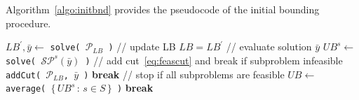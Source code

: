\documentclass[a4paper,11pt]{article}
\begin{document}
{	Algorithm~\ref{algo:initbnd} provides the pseudocode of the initial bounding procedure.
	\begin{algorithm}[!h]
		\small
		\caption{Initial bonding procedure}\label{algo:initbnd}
		\begin{algorithmic}[1]
			\State $LB^\prime, \bar{y} \gets$ \texttt{solve( $ \mathcal{P}_{LB}$ )}
			\State // update LB
			\State $ LB = LB^\prime$
			\EndIf 
			\State // evaluate solution $\bar{y}$ 
			\State $UB^s \gets$ \texttt{solve( $\mathcal{SP}^s(\bar{y})$ )}
			\State // add cut~\eqref{eq:feascut} and break if subproblem infeasible
			\State \texttt{addCut( $ \mathcal{P}_{LB}$, $\bar{y}$ )}
			\State \textbf{break}
			\EndIf
			\EndFor
			\State  // stop if all subproblems are feasible
			\State $UB \gets$ \texttt{average( $\{\, UB^s \, : \, s \in S \,\}$ )}
			\State \textbf{break}
			\EndIf
			\EndWhile
			\EndProcedure
		\end{algorithmic}
	\end{algorithm}
	}
\end{document}
